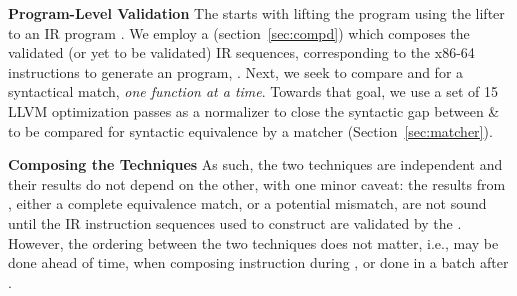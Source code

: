 \textbf{Program-Level Validation} The \plv starts with lifting the \ISA
program  using the lifter  to an IR program .
%
We employ a \compd (section~\ref{sec:compd}) which composes the validated (or
yet to be validated) IR sequences, corresponding to the x86-64 instructions to
generate an \LLVM program, .
%
Next, we seek to compare  and  for a syntactical match,
\emph{one function at a time}. Towards that goal, we use a set of 15 LLVM
optimization passes as a normalizer to close the syntactic gap between 
\&  to be compared for syntactic equivalence by a matcher
(Section~\ref{sec:matcher}). 

\textbf{Composing the Techniques} As such, the two techniques are
independent and their results do not depend on the other, with one minor
caveat: the results from \plv, either a complete equivalence match, or a
potential mismatch, are not sound until the IR instruction sequences used to construct
 are validated by the \siv. However, the ordering between the two
techniques does not matter, i.e., \siv may be done ahead of time, when
composing instruction during \plv, or done in a batch after \plv.


